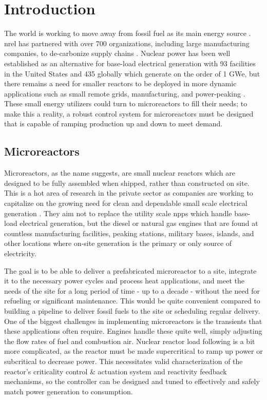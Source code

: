 \chapter{Introduction}
\label{Chapter:Introduction}
The world is working to move away from fossil fuel as its main energy source \cite{ValluriPHD}. \acf{nrel} has partnered with over 700 organizations, including large manufacturing companies, to de-carbonize supply chains \cite{NREL-partner}. Nuclear power has been well established as an alternative for base-load electrical generation with 93 facilities in the United States and 435 globally which generate on the order of 1 GWe, but there remains a need for smaller reactors to be deployed in more dynamic applications such as small remote grids, manufacturing, and power-peaking \cite{DoD-remote}. These small energy utilizers could turn to microreactors to fill their needs; to make this a reality, a robust control system for microreactors must be designed that is capable of ramping production up and down to meet demand.

\section{Microreactors}
Microreactors, as the name suggests, are small nuclear reactors which are designed to be fully assembled when shipped, rather than constructed on site. This is a hot area of research in the private sector as companies are working to capitalize on the growing need for clean and dependable small scale electrical generation \cite{PetersonMS}. They aim not to replace the utility scale \acfp{npp} which handle base-load electrical generation, but the diesel or natural gas engines that are found at countless manufacturing facilities, peaking stations, military bases, islands, and other locations where on-site generation is the primary or only source of electricity. 

The goal is to be able to deliver a prefabricated microreactor to a site, integrate it to the necessary power cycles and process heat applications, and meet the needs of the site for a long period of time - up to a decade - without the need for refueling or significant maintenance. This would be quite convenient compared to building a pipeline to deliver fossil fuels to the site or scheduling regular delivery. One of the biggest challenges in implementing microreactors is the transients that these applications often require. Engines handle these quite well, simply adjusting the flow rates of fuel and combustion air. Nuclear reactor load following is a bit more complicated, as the reactor must be made supercritical to ramp up power or subcritical to decrease power. This necessitates valid characterization of the reactor's criticality control \& actuation system and reactivity feedback mechanisms, so the controller can be designed and tuned to effectively and safely match power generation to consumption.

